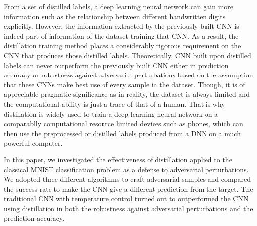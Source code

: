 \documentclass{article}
\begin{document}
From a set of distilled labels, a deep learning neural network can gain more information such as the relationship between different handwritten digits explicitly. However, the information extracted by the previously built CNN is indeed part of information of the dataset training that CNN.
As a result, the distillation training method places a considerably rigorous requirement on the CNN that produces those distilled labels.
Theoretically, CNN built upon distilled labels can never outperform the previously built CNN either in prediction accuracy or robustness against adversarial perturbations based on the assumption that these CNNs make best use of every sample in the dataset. 
Though, it is of appreciable pragmatic significance as in reality, the dataset is always limited and the computational ability is just a trace of that of a human.
That is why distillation is widely used to train a deep learning neural network on a comparablly computational resource limited devices such as phones, which can then use the preprocessed or distilled labels produced from a DNN on a much powerful computer.

In this paper, we investigated the effectiveness of distillation applied to the classical MNIST classification problem as a defense to adversarial perturbations. We adopted three different algorithms to craft adversarial samples and compared the success rate to make the CNN give a different prediction from the target.
The traditional CNN with temperature control turned out to outperformed the CNN using distillation in both the robustness against adversarial perturbations and the prediction accuracy. 







\end{document}
